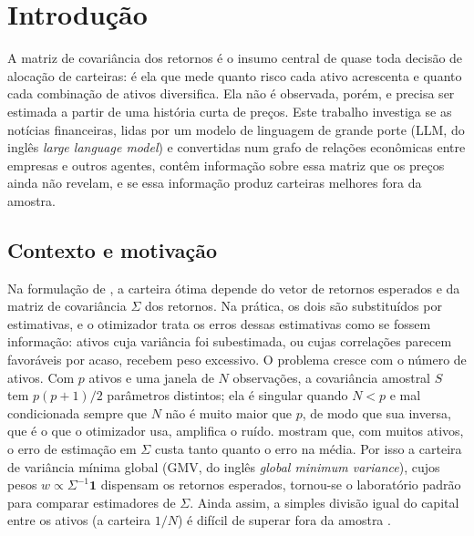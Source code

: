 \chapter{Introdução}
\label{cap:introducao}

A matriz de covariância dos retornos é o insumo central de quase toda decisão de alocação de
carteiras: é ela que mede quanto risco cada ativo acrescenta e quanto cada combinação de ativos
diversifica. Ela não é observada, porém, e precisa ser estimada a partir de uma história curta de
preços. Este trabalho investiga se as notícias financeiras, lidas por um modelo de linguagem de grande
porte (LLM, do inglês \emph{large language model}) e convertidas num grafo de relações econômicas entre
empresas e outros agentes, contêm informação sobre essa matriz que os preços ainda não revelam, e se
essa informação produz carteiras melhores fora da amostra.

\section{Contexto e motivação}
\label{sec:motivacao}

Na formulação de \citet{markowitz1952}, a carteira ótima depende do vetor de retornos esperados e da
matriz de covariância $\Sigma$ dos retornos. Na prática, os dois são substituídos por estimativas, e o
otimizador trata os erros dessas estimativas como se fossem informação: ativos cuja variância foi
subestimada, ou cujas correlações parecem favoráveis por acaso, recebem peso excessivo. O problema
cresce com o número de ativos. Com $p$ ativos e uma janela de $N$ observações, a covariância amostral
$S$ tem $p(p+1)/2$ parâmetros distintos; ela é singular quando $N<p$ e mal condicionada sempre que
$N$ não é muito maior que $p$, de modo que sua inversa, que é o que o otimizador usa, amplifica o
ruído. \citet{kan2007} mostram que, com muitos ativos, o erro de estimação em $\Sigma$ custa tanto
quanto o erro na média. Por isso a carteira de variância mínima global (GMV, do inglês \emph{global
minimum variance}), cujos pesos $w\propto\Sigma^{-1}\mathbf 1$ dispensam os retornos esperados,
tornou-se o laboratório padrão para comparar estimadores de $\Sigma$. Ainda assim, a simples divisão
igual do capital entre os ativos (a carteira $1/N$) é difícil de superar fora da amostra
\citep{demiguel2009}.


